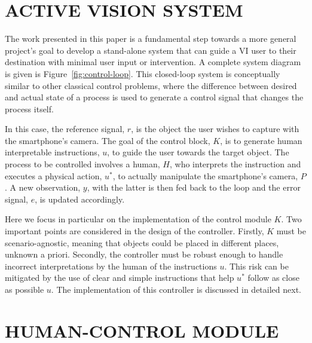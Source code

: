 \documentclass[a4paper, twoside]{article}
\begin{document}
\section{\uppercase{Active Vision System}}\label{sec:system-design}

\noindent The work presented in this paper is a fundamental step towards a more general project's goal to develop a stand-alone system that can guide a VI user to their destination with minimal user input or intervention. A complete system diagram is given is Figure~\ref{fig:control-loop}. This closed-loop system is conceptually similar to other classical control problems, where the difference between desired and actual state of a process is used to generate a control signal that changes the process itself.

In this case, the reference signal, $r$, is the object the user wishes to capture with the smartphone's camera. The goal of the control block, $K$, is to generate human interpretable instructions, $u$, to guide the user towards the target object. The process to be controlled involves a human, $H$, who interprets the instruction and executes a physical action, $u^*$, to actually manipulate the smartphone's camera, $P$. A new observation, $y$, with the latter is then fed back to the loop and the error signal, $e$, is updated accordingly.  

Here we focus in particular on the implementation of the control module $K$. Two important points are considered in the design of the controller. Firstly, $K$ must be scenario-agnostic, meaning that objects could be placed in different places, unknown a priori. Secondly, the controller must be robust enough to handle incorrect interpretations by the human of the instructions $u$. This risk can be mitigated by the use of clear and simple instructions that help $u^*$ follow as close as possible $u$. The implementation of this controller is discussed in detailed next. 

\section{\uppercase{Human-control Module}}\label{sec:controller-design}
\end{document}
